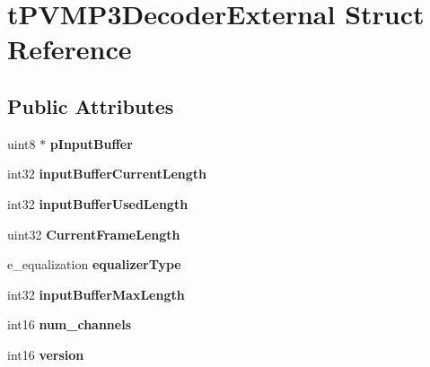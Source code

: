 \hypertarget{structtPVMP3DecoderExternal}{}\section{t\+P\+V\+M\+P3\+Decoder\+External Struct Reference}
\label{structtPVMP3DecoderExternal}
\subsection*{Public Attributes}
\begin{DoxyCompactItemize}
\item 
\mbox{\label{structtPVMP3DecoderExternal_acd89ad5a01b5da8f2ab4985803316cd8}} 
uint8 $\ast$ {\bfseries p\+Input\+Buffer}
\item 
\mbox{\label{structtPVMP3DecoderExternal_a759d6e80c2aeea226a6e2ba27ff11592}} 
int32 {\bfseries input\+Buffer\+Current\+Length}
\item 
\mbox{\label{structtPVMP3DecoderExternal_a631c3a306d6448047eb3c13e41584988}} 
int32 {\bfseries input\+Buffer\+Used\+Length}
\item 
\mbox{\label{structtPVMP3DecoderExternal_a06bd8b6de53c145d694233b34b16e75b}} 
uint32 {\bfseries Current\+Frame\+Length}
\item 
\mbox{\label{structtPVMP3DecoderExternal_a6c6e1165f93f05dbf819bd1b114cfd6f}} 
e\+\_\+equalization {\bfseries equalizer\+Type}
\item 
\mbox{\label{structtPVMP3DecoderExternal_a5dd6a96b105c598dd46a70ce12d9b722}} 
int32 {\bfseries input\+Buffer\+Max\+Length}
\item 
\mbox{\label{structtPVMP3DecoderExternal_a1dab66ff061c9fe4622edaa2d40d2feb}} 
int16 {\bfseries num\+\_\+channels}
\item 
\mbox{\label{structtPVMP3DecoderExternal_ace340da19cf0d73d6e3d57c2fefb42ff}} 
int16 {\bfseries version}
\item 

\end{DoxyCompactItemize}
